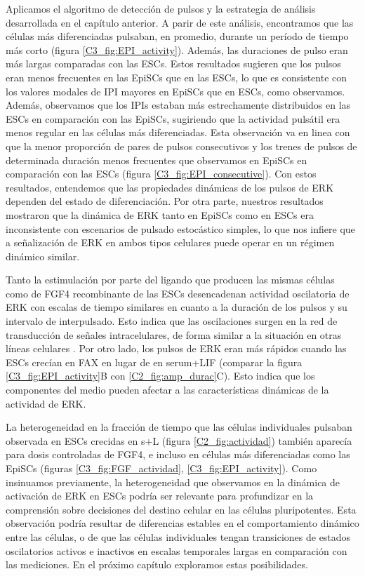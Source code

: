 \documentclass[./main.tex]{subfiles}
\begin{document}
Aplicamos el algoritmo de detección de pulsos y la estrategia de análisis desarrollada en el capítulo anterior. A parir de este análisis, encontramos que las células más diferenciadas pulsaban, en promedio, durante un período de tiempo más corto (figura \ref{C3_fig:EPI_activity}). Además, las duraciones de pulso eran más largas comparadas con las ESCs. Estos resultados sugieren que los pulsos eran menos frecuentes en las EpiSCs que en las ESCs, lo que es consistente con los valores modales de IPI mayores en EpiSCs que en ESCs, como observamos. Además, observamos que los IPIs estaban más estrechamente distribuidos en las ESCs en comparación con las EpiSCs, sugiriendo que la actividad pulsátil era menos regular en las células más diferenciadas. Esta observación va en linea con que la menor proporción de pares de pulsos consecutivos y los trenes de pulsos de determinada duración menos frecuentes que observamos en EpiSCs en comparación con las ESCs (figura \ref{C3_fig:EPI_consecutive}). Con estos resultados, entendemos que las propiedades dinámicas de los pulsos de ERK dependen del estado de diferenciación. Por otra parte, nuestros resultados mostraron que la dinámica de ERK tanto en EpiSCs como en ESCs era inconsistente con escenarios de pulsado estocástico simples, lo que nos infiere que a señalización de ERK en ambos tipos celulares puede operar en un régimen dinámico similar. 

Tanto la estimulación por parte del ligando que producen las mismas células como de FGF4 recombinante de las ESCs desencadenan actividad oscilatoria de ERK con escalas de tiempo similares en cuanto a la duración de los pulsos y su intervalo de interpulsado. Esto indica que las oscilaciones surgen en la red de transducción de señales intracelulares, de forma similar a la situación en otras líneas celulares \cite{Sparta2015}. Por otro lado, los pulsos de ERK eran más rápidos cuando las ESCs crecían en FAX en lugar de en serum+LIF (comparar la figura \ref{C3_fig:EPI_activity}B con \ref{C2_fig:amp_durac}C). Esto indica que los componentes del medio pueden afectar a las características dinámicas de la actividad de ERK. 

La heterogeneidad en la fracción de tiempo que las células individuales pulsaban observada en ESCs crecidas en s+L (figura \ref{C2_fig:actividad}) también aparecía para dosis controladas de FGF4, e incluso en células más diferenciadas como las EpiSCs (figuras \ref{C3_fig:FGF_actividad}, \ref{C3_fig:EPI_activity}). Como insinuamos previamente, la heterogeneidad que observamos en la dinámica de activación de ERK en ESCs podría ser relevante para profundizar en la comprensión sobre decisiones del destino celular en las células pluripotentes. Esta observación podría resultar de diferencias estables en el comportamiento dinámico entre las células, o de que las células individuales tengan transiciones de estados oscilatorios activos e inactivos en escalas temporales largas en comparación con las mediciones. En el próximo capítulo exploramos estas posibilidades. 
\end{document}

